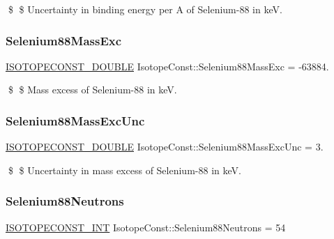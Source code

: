\$ \$ Uncertainty in binding energy per A of Selenium-\/88 in keV. \mbox{\label{group___isotope_const-_selenium-_se88_ga8782da9c28f49346562f4471deefa4d7}} 
\subsubsection{\texorpdfstring{Selenium88\+Mass\+Exc}{Selenium88MassExc}}
{\footnotesize\ttfamily \mbox{\hyperlink{group___isotope_const-_macros_ga8f45a7272ce02c0b4c65c44636ed719a}{I\+S\+O\+T\+O\+P\+E\+C\+O\+N\+S\+T\+\_\+\+D\+O\+U\+B\+LE}} Isotope\+Const\+::\+Selenium88\+Mass\+Exc = -\/63884.}

\$ \$ Mass excess of Selenium-\/88 in keV. \mbox{\label{group___isotope_const-_selenium-_se88_ga6b768407c49508bc94162769946eb6ff}} 
\subsubsection{\texorpdfstring{Selenium88\+Mass\+Exc\+Unc}{Selenium88MassExcUnc}}
{\footnotesize\ttfamily \mbox{\hyperlink{group___isotope_const-_macros_ga8f45a7272ce02c0b4c65c44636ed719a}{I\+S\+O\+T\+O\+P\+E\+C\+O\+N\+S\+T\+\_\+\+D\+O\+U\+B\+LE}} Isotope\+Const\+::\+Selenium88\+Mass\+Exc\+Unc = 3.}

\$ \$ Uncertainty in mass excess of Selenium-\/88 in keV. \mbox{\label{group___isotope_const-_selenium-_se88_gac2625f857c8cfb8e7ae88dd0457c03d9}} 
\subsubsection{\texorpdfstring{Selenium88\+Neutrons}{Selenium88Neutrons}}
{\footnotesize\ttfamily \mbox{\hyperlink{group___isotope_const-_macros_ga5f18360b3e99483a35c32d789e62621c}{I\+S\+O\+T\+O\+P\+E\+C\+O\+N\+S\+T\+\_\+\+I\+NT}} Isotope\+Const\+::\+Selenium88\+Neutrons = 54}

